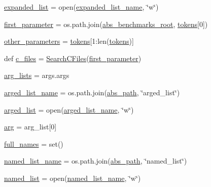 \begin{DoxyCompactItemize}
\item 
\hyperlink{namespacetest__panda_ade223f0d3fedb6555ab1efdb9992732b}{expanded\+\_\+list} = open(\hyperlink{namespacetest__panda_ad1931f0d30dc5508b22ea73a25760392}{expanded\+\_\+list\+\_\+name}, \char`\"{}w\char`\"{})
\item 
\hyperlink{namespacetest__panda_aeecf7e98e2fb79a7524ba0a517d191fc}{first\+\_\+parameter} = os.\+path.\+join(\hyperlink{namespacetest__panda_a420b78aa50adb0ce19e2fe6e434faa66}{abs\+\_\+benchmarks\+\_\+root}, \hyperlink{namespacetest__panda_a2d26dd74cc87c155c90e49e45383a469}{tokens}\mbox{[}0\mbox{]})
\item 
\hyperlink{namespacetest__panda_aea794e355dfc20d01e029cde56d3501f}{other\+\_\+parameters} = \hyperlink{namespacetest__panda_a2d26dd74cc87c155c90e49e45383a469}{tokens}\mbox{[}1\+:len(\hyperlink{namespacetest__panda_a2d26dd74cc87c155c90e49e45383a469}{tokens})\mbox{]}
\item 
def \hyperlink{namespacetest__panda_a7b869db3f6bfe3c484270ba1a5298262}{c\+\_\+files} = \hyperlink{namespacetest__panda_a8292fd9f0436c65b76dc0689a5be68c0}{Search\+C\+Files}(\hyperlink{namespacetest__panda_aeecf7e98e2fb79a7524ba0a517d191fc}{first\+\_\+parameter})
\item 
\hyperlink{namespacetest__panda_acf2def5ffdab7a90494f531ad4942e6c}{arg\+\_\+lists} = args.\+args
\item 
\hyperlink{namespacetest__panda_a86167c53a37ca31bb5d2793a6a74a8e3}{arged\+\_\+list\+\_\+name} = os.\+path.\+join(\hyperlink{namespacetest__panda_a78bb23566d04ac65a03195681449d2c0}{abs\+\_\+path}, \char`\"{}arged\+\_\+list\char`\"{})
\item 
\hyperlink{namespacetest__panda_a8b03b0fb1390a5d88cdff029605940b4}{arged\+\_\+list} = open(\hyperlink{namespacetest__panda_a86167c53a37ca31bb5d2793a6a74a8e3}{arged\+\_\+list\+\_\+name}, \char`\"{}w\char`\"{})
\item 
\hyperlink{namespacetest__panda_a1978491117258030555828342729e788}{arg} = arg\+\_\+list\mbox{[}0\mbox{]}
\item 
\hyperlink{namespacetest__panda_a4417256b79fabbb6016d9e1d90f6cebc}{full\+\_\+names} = set()
\item 
\hyperlink{namespacetest__panda_a55a11ca1425cca9bf61f5e1047db06a0}{named\+\_\+list\+\_\+name} = os.\+path.\+join(\hyperlink{namespacetest__panda_a78bb23566d04ac65a03195681449d2c0}{abs\+\_\+path}, \char`\"{}named\+\_\+list\char`\"{})
\item 
\hyperlink{namespacetest__panda_a2989f96cdaa7a4aef74fb9e12de11b07}{named\+\_\+list} = open(\hyperlink{namespacetest__panda_a55a11ca1425cca9bf61f5e1047db06a0}{named\+\_\+list\+\_\+name}, \char`\"{}w\char`\"{})

\end{DoxyCompactItemize}
